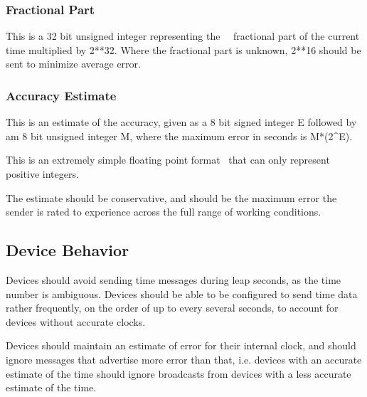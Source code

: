 \documentclass{article}
\begin{document}
\bigskip


\bigskip


\bigskip


\bigskip


\bigskip


\bigskip


\bigskip


\bigskip

\subsubsection{Fractional Part}
This is a 32 bit unsigned integer representing the \ \ fractional part of the current time multiplied by 2**32. Where the fractional part is unknown, 2**16 should be sent to minimize average error.

\subsubsection{Accuracy Estimate}
This is an estimate of the accuracy, given as a 8 bit signed integer E followed by am 8 bit unsigned integer M, where the maximum error in seconds is M*(2\^{}E).

This is an extremely simple floating point format \ that can only represent positive integers.

The estimate should be conservative, and should be the maximum error the sender is rated to experience across the full range of working conditions.

\subsection{Device Behavior}
Devices should avoid sending time messages during leap seconds, as the time number is ambiguous. Devices should be able to be configured to send time data rather frequently, on the order of up to every several seconds, to account for devices without accurate clocks.

Devices should maintain an estimate of error for their internal clock, and should ignore messages that advertise more error than that, i.e. devices with an accurate estimate of the time should ignore broadcasts from devices with a less accurate estimate of the time.
\end{document}

